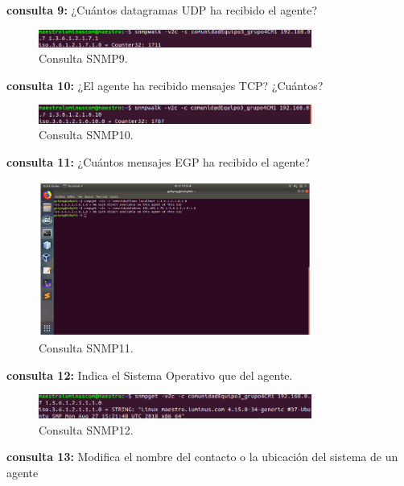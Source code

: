 \textbf{consulta 9:} ¿Cuántos datagramas UDP ha recibido el agente?

\begin{figure}[htbp!]
	\centering
		\includegraphics[width=0.8\textwidth]{images/capturas/pregunta9}
	\caption{Consulta SNMP9.}
\end{figure}

\pagebreak
\textbf{consulta 10:} ¿El agente ha recibido mensajes TCP? ¿Cuántos?

\begin{figure}[htbp!]
	\centering
		\includegraphics[width=0.8\textwidth]{images/capturas/pregunta10}
	\caption{Consulta SNMP10.}
\end{figure}

\textbf{consulta 11:} ¿Cuántos mensajes EGP ha recibido el agente?

\begin{figure}[htbp!]
	\centering
		\includegraphics[width=0.8\textwidth]{images/capturas/pregunta11}
	\caption{Consulta SNMP11.}
\end{figure}

\textbf{consulta 12:} Indica el Sistema Operativo que del agente.

\begin{figure}[htbp!]
	\centering
		\includegraphics[width=0.8\textwidth]{images/capturas/pregunta12}
	\caption{Consulta SNMP12.}
\end{figure}

\textbf{consulta 13:} Modifica el nombre del contacto o la ubicación del sistema de un agente

